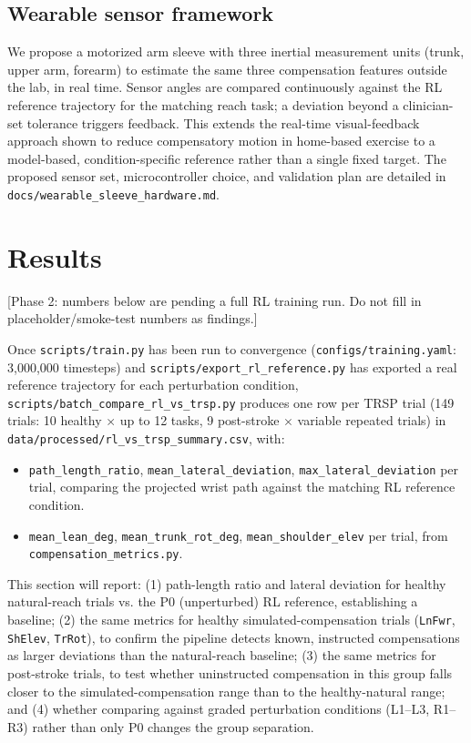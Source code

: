 \documentclass[11pt]{article}
\begin{document}
\subsection{Wearable sensor framework}

We propose a motorized arm sleeve with three inertial measurement units (trunk, upper arm, forearm) to estimate the same three compensation features outside the lab, in real time. Sensor angles are compared continuously against the RL reference trajectory for the matching reach task; a deviation beyond a clinician-set tolerance triggers feedback. This extends the real-time visual-feedback approach shown to reduce compensatory motion in home-based exercise \citep{Lin2019} to a model-based, condition-specific reference rather than a single fixed target. The proposed sensor set, microcontroller choice, and validation plan are detailed in \texttt{docs/wearable\_sleeve\_hardware.md}.

\section{Results}

[Phase 2: numbers below are pending a full RL training run. Do not fill in placeholder/smoke-test numbers as findings.]

Once \texttt{scripts/train.py} has been run to convergence (\texttt{configs/training.yaml}: 3{,}000{,}000 timesteps) and \texttt{scripts/export\_rl\_reference.py} has exported a real reference trajectory for each perturbation condition, \texttt{scripts/batch\_compare\_rl\_vs\_trsp.py} produces one row per TRSP trial (149 trials: 10 healthy $\times$ up to 12 tasks, 9 post-stroke $\times$ variable repeated trials) in \texttt{data/processed/rl\_vs\_trsp\_summary.csv}, with:

\begin{itemize}
  \item \texttt{path\_length\_ratio}, \texttt{mean\_lateral\_deviation}, \texttt{max\_lateral\_deviation} per trial, comparing the projected wrist path against the matching RL reference condition.
  \item \texttt{mean\_lean\_deg}, \texttt{mean\_trunk\_rot\_deg}, \texttt{mean\_shoulder\_elev} per trial, from \texttt{compensation\_metrics.py}.
\end{itemize}

This section will report: (1) path-length ratio and lateral deviation for healthy natural-reach trials vs. the P0 (unperturbed) RL reference, establishing a baseline; (2) the same metrics for healthy simulated-compensation trials (\texttt{LnFwr}, \texttt{ShElev}, \texttt{TrRot}), to confirm the pipeline detects known, instructed compensations as larger deviations than the natural-reach baseline; (3) the same metrics for post-stroke trials, to test whether uninstructed compensation in this group falls closer to the simulated-compensation range than to the healthy-natural range; and (4) whether comparing against graded perturbation conditions (L1--L3, R1--R3) rather than only P0 changes the group separation.
\end{document}

